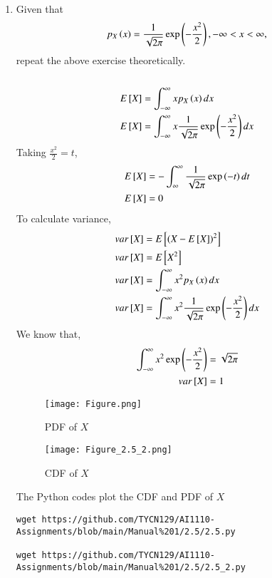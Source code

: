 \documentclass[journal,12pt,twocolumn]{IEEEtran}
\renewcommand\thesection{\arabic{section}}
\begin{document}
\begin{enumerate}[label=\thesection.\arabic*
,ref=\thesection.\theenumi]
\item Given that 
\begin{align}
p_{X}\left(x\right) = \frac{1}{\sqrt{2\pi}}\exp\left(-\frac{x^2}{2}\right), -\infty < x < \infty,
\end{align}
repeat the above exercise theoretically.\\
\solution\\
\begin{align}
    E{}\left[X\right] &= \int_{-\infty}^{\infty}x p_{X}\left(x\right) dx \\
    E{}\left[X\right] &= \int_{-\infty}^{\infty}x
    \frac{1}{\sqrt{2\pi}}\exp\left(-\frac{x^2}{2}\right) dx    
\end{align}
Taking $\frac{x^2}{2} = t$,
\begin{align}
    E{}\left[X\right] &= -\int_{\infty}^{\infty}
    \frac{1}{\sqrt{2\pi}}\exp\left(-t\right) dt\\
    E{}\left[X\right] &= 0
\end{align}
To calculate variance,
\begin{align}
    var{}\left[X\right] &= E{}\left[(X - E{}\left[X\right])^2\right]\\
    var{}\left[X\right] &= E{}\left[X^2\right]\\
    var{}\left[X\right] &= \int_{-\infty}^{\infty}x^2 p_{X}\left(x\right) dx \\
    var{}\left[X\right] &= \int_{-\infty}^{\infty}x^2
    \frac{1}{\sqrt{2\pi}}\exp\left(-\frac{x^2}{2}\right) dx 
\end{align}
We know that,
\begin{align}
    \int_{-\infty}^{\infty}x^2\exp\left(-\frac{x^2}{2}\right) &= \sqrt{2\pi}\\
    var{}\left[X\right] &= 1
\end{align}
\begin{figure}[h!]
    \centering
    \texttt{[image: Figure.png]}
    \caption{PDF of $X$}
    \label{fig:my_label}
\end{figure}

\begin{figure}[h!]
    \centering
    \texttt{[image: Figure\_2.5\_2.png]}
    \caption{CDF of $X$}
    \label{fig:my_label}
\end{figure}
\clearpage
The Python codes plot the CDF and PDF of $X$
\begin{lstlisting}
wget https://github.com/TYCN129/AI1110-Assignments/blob/main/Manual%201/2.5/2.5.py

wget https://github.com/TYCN129/AI1110-Assignments/blob/main/Manual%201/2.5/2.5_2.py
\end{lstlisting}
\end{enumerate}
\end{document}
